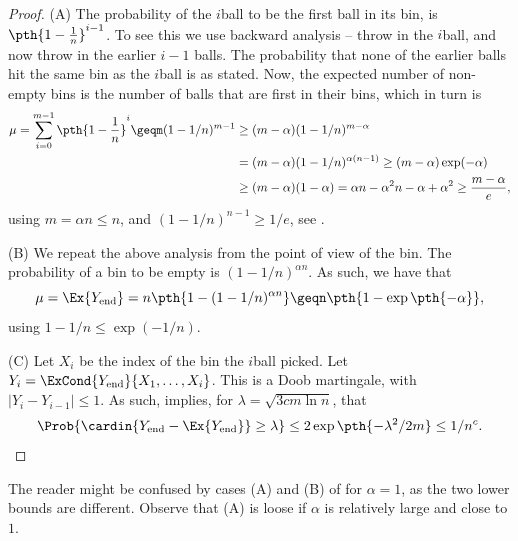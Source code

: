 \begin{proof}
    (A) The probability of the $i$\th ball to be the first ball in its
    bin, is $\pth{ 1- \frac{1}{n}}^{i-1}$. To see this we use backward
    analysis -- throw in the $i$\th ball, and now throw in the earlier
    $i-1$ balls. The probability that none of the earlier balls hit
    the same bin as the $i$\th ball is as stated. Now, the expected
    number of non-empty bins is the number of balls that are first in
    their bins, which in turn is
    \begin{align*}
      \mu%
      =%
      \sum_{i=0}^{m-1} \pth{ 1- \frac{1}{n}}^{i}
      \geq%
      m (1-1/n)^{m-1}
      &\geq%
        (m-\alpha) (1-1/n)^{m-\alpha}
      \\&
      =%
      (m-\alpha) (1-1/n)^{\alpha(n-1)}
      \geq %
      (m-\alpha) \exp( -\alpha)
      \\&
      \geq
      (m-\alpha) (1-\alpha)
      =%
      \alpha n  - \alpha^2 n
      -\alpha + \alpha^2
      \geq
      \frac{m-\alpha}{e},
    \end{align*}
    using $m = \alpha n \leq n$, and $(1-1/n)^{n-1} \geq 1/e$, see
    .

    \medskip%
    (B) We repeat the above analysis from the point of view of the
    bin. The probability of a bin to be empty is $(1-1/n)^{\alpha
       n}$. As such, we have that
    \begin{equation*}
        \mu %
        =%
        \Ex{\Yend}%
        =%
        n\pth{ 1-(1-1/n)^{\alpha n}}%
        \geq%
        n\pth{ 1-\exp\pth{ -\alpha }},
    \end{equation*}
    using $1-1/n \leq \exp(-1/n)$.

    
    \medskip%
    (C) Let $X_i$ be the index of the bin the $i$\th ball picked. Let
    $Y_i = \ExCond{\Yend}{X_1, \ldots, X_i}$. This is a Doob
    martingale, with $|Y_i - Y_{i-1}| \leq 1$. As such,
     implies, for
    $\lambda = \sqrt{ 3c m \ln n}$, that
    \begin{equation*}
        \Prob{ \bigl. \cardin{\Yend - \Ex{\Yend}} \geq \lambda}%
        \leq%
        2\exp \pth{-\lambda^2/ 2m}%
        \leq%
        1/n^c. 
    \end{equation*}
\end{proof}%
\smallskip%

\begin{remark_unnumbered}
    The reader might be confused by cases (A) and (B) of
     for $\alpha =1$, as the two lower bounds are
    different. Observe that (A) is loose if $\alpha$ is relatively
    large and close to $1$.
\end{remark_unnumbered}

